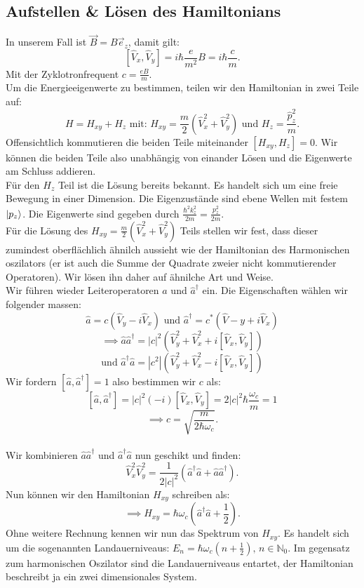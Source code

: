 \documentclass{report}
\begin{document}
\subsection{Aufstellen \& Lösen des Hamiltonians}
In unserem Fall ist $\vec{B} = B \vec{e}_z$, damit gilt: \[
	[\hat{V}_x, \hat{V}_y] = i\hbar \frac{e}{m^2} B = i \hbar \frac{c}{m}
.\] Mit der Zyklotronfrequent $c = \frac{eB}{m}$. \\
Um die Energieeigenwerte zu bestimmen, teilen wir den Hamiltonian in zwei Teile auf: \[
	H = H_{xy} + H_z \text{ mit: } H_{xy} = \frac{m}{2} \left( \hat{V}_x^2 + \hat{V}_y^2 \right) \text{ und } H_z = \frac{\hat{p}_z^2}{m}	
.\] Offensichtlich kommutieren die beiden Teile miteinander $[H_{xy}, H_z] = 0$. Wir können die beiden Teile also unabhängig von einander Lösen und die Eigenwerte am Schluss addieren. \\
Für den $H_z$ Teil ist die Lösung bereits bekannt. Es handelt sich um eine freie Bewegung in einer Dimension. Die Eigenzustände sind ebene Wellen mit festem $\ket{p_z} $. Die Eigenwerte sind gegeben durch $\frac{\hbar^2 k_z^2}{2m} = \frac{p_z^2}{2m}$. \\
Für die Lösung des $H_{xy} = \frac{m}{2} (\hat{V}_x^2 + \hat{V}_y^2)$ Teils stellen wir fest, dass dieser zumindest oberflächlich ähnilch aussieht wie der Hamiltonian des Harmonischen oszilators (er ist auch die Summe der Quadrate zweier nicht kommutierender Operatoren). Wir lösen ihn daher auf ähnilche Art und Weise. \\
Wir führen wieder Leiteroperatoren $\hat{a}$ und $\hat{a}^\dagger$ ein. Die Eigenschaften wählen wir folgender massen: \[
	\hat{a} = c (\hat{V}_y - i \hat{V}_x) \text{ und } \hat{a}^\dagger = c^* (\hat{V}-y + i \hat{V}_x)
\] \[
\implies \hat{a} \hat{a}^\dagger = |c|^2 (\hat{V}_y^2 + \hat{V}_x^2 + i [\hat{V}_x, \hat{V}_y])
\] \[
\text{und } \hat{a}^\dagger \hat{a} = |c^2| \left( \hat{V}_y^2 + \hat{V}_x^2 - i[\hat{V}_x, \hat{V}_y] \right) 
\] Wir fordern $[\hat{a}, \hat{a}^\dagger] = 1$ also bestimmen wir $c$ als: \[
[\hat{a}, \hat{a}^\dagger] = |c|^2 (-i) [\hat{V}_x, \hat{V}_y] = 2 |c|^2 \hbar \frac{\omega_c}{m} = 1
\]  \[
 \implies c = \sqrt{\frac{m}{2 \hbar \omega_c}} 
.\]  \\
Wir kombinieren $\hat{a}\hat{a}^\dagger$ und $\hat{a}^\dagger \hat{a}$ nun geschikt und finden: \[
	\hat{V}_x^2 \hat{V}_y^2 = \frac{1}{2|c|^2} (\hat{a}^\dagger \hat{a} + \hat{a} \hat{a}^\dagger)
.\] Nun können wir den Hamiltonian $H_{xy}$ schreiben als: \[
\implies H_{xy} = \hbar \omega_c (\hat{a}^\dagger \hat{a} + \frac{1}{2})
.\] Ohne weitere Rechnung kennen wir nun das Spektrum von $H_{xy}$. Es handelt sich um die sogenannten Landauerniveaus: $E_n = \hbar \omega_c \left( n + \frac{1}{2} \right) \text{, } n \in \mathbb{N}_0 $.
Im gegensatz zum harmonischen Oszilator sind die Landauerniveaus entartet, der Hamiltonian beschreibt ja ein zwei dimensionales System.
\end{document}
